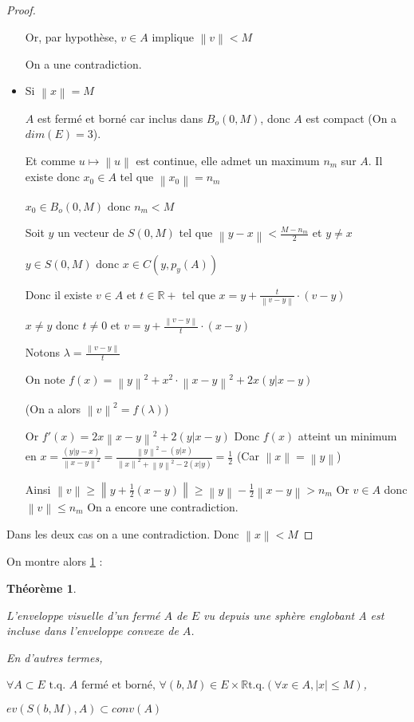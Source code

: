 \documentclass[a4paper]{article}
\newcommand{\norm}[1]{\left\lVert#1\right\rVert}
\newtheorem{theo}{Théorème}
\begin{document}
\begin{proof}
\begin{itemize}
Or, par hypothèse, $v \in A$ implique $\norm{v} < M$

On a une contradiction.

\item Si  $\norm{x} = M$

$A$ est fermé et borné car inclus dans $B_{o}(0, M)$, donc $A$ est compact (On a $dim(E) = 3$).

Et comme $u \mapsto \norm{u}$ est continue, elle admet un maximum $n_{m}$ sur $A$. Il existe donc $x_{0} \in A$ tel que $\norm{x_{0}} = n_{m}$

$x_{0} \in B_{o}(0, M)$ donc $n_{m} < M$

Soit $y$ un vecteur de $S(0, M)$ tel que $\norm{y - x} < \frac{M - n_{m}}{2}$ et $y \neq x$

$y \in S(0, M)$ donc $x \in C(y, p_{y}(A))$

Donc il existe $v \in A$ et $t \in \mathbb{R}+$ tel que $x = y + \frac{t}{\norm{v - y}} \cdot (v - y)$

$x \neq y$ donc $t \neq 0$ et $v = y + \frac{\norm{v - y}}{t} \cdot (x - y)$

Notons $\lambda = \frac{\norm{v - y}}{t}$

On note $f(x) = \norm{y}^{2} + x^{2} \cdot \norm{x - y}^{2} + 2 x (y|x - y)$

(On a alors $\norm{v}^{2} = f(\lambda)$)

Or $f'(x) = 2 x \norm{x - y}^{2} + 2(y|x - y)$
Donc $f(x)$ atteint un minimum en $x = \frac{(y|y - x)}{\norm{x - y}^2} = \frac{\norm{y}^{2} - (y|x)}{\norm{x}^{2} + \norm{y}^{2} - 2 (x|y)} = \frac{1}{2}$ (Car $\norm{x} = \norm{y}$)

Ainsi $\norm{v} \geqslant \norm{y + \frac{1}{2} (x - y)} \geqslant \norm{y} - \frac{1}{2} \norm{x - y} > n_{m}$
Or $v \in A$  donc $\norm{v} \leqslant n_{m}$
On a encore une contradiction.
\end{itemize}
Dans les deux cas on a une contradiction.
Donc $\norm{x} < M$
\end{proof}


On montre alors \ref{th1} :

\begin{theo}\label{th1}

L'enveloppe visuelle d'un fermé $A$ de $E$ vu depuis une sphère englobant A est incluse dans l'enveloppe convexe de $A$.

En d'autres termes, 

$\forall A \subset E \text{ t.q. $A$ fermé et borné, } \forall (b, M) \in E \times \mathbb{R} \text{t.q.} (\forall x \in A, |x| \leqslant M)$,

$ev(S(b, M), A) \subset conv(A)$

\end{theo}
\end{document}
